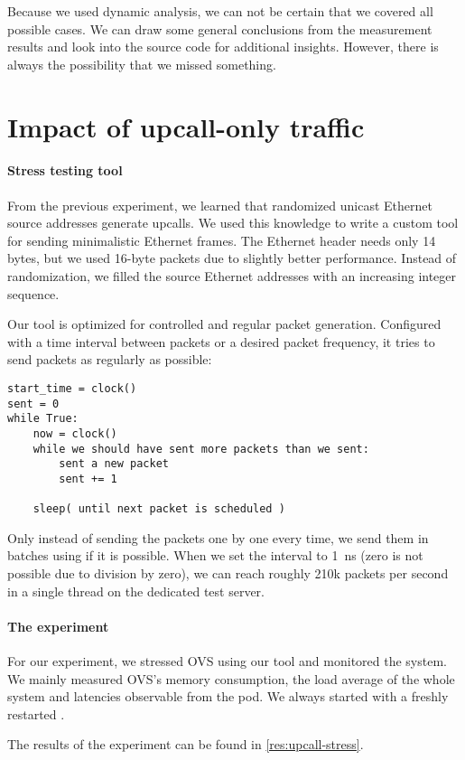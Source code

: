 Because we used dynamic analysis, we can not be certain that we covered all possible cases. We can draw some general conclusions from the measurement results and look into the source code for additional insights. However, there is always the possibility that we missed something.

\section{Impact of upcall-only traffic}
\label{design:upcall-impact}

\paragraph{Stress testing tool}
From the previous experiment, we learned that randomized unicast Ethernet source addresses generate upcalls. We used this knowledge to write a custom tool for sending minimalistic Ethernet frames. The Ethernet header needs only 14 bytes, but we used 16-byte packets due to slightly better performance. Instead of randomization, we filled the source Ethernet addresses with an increasing integer sequence.

Our tool is optimized for controlled and regular packet generation. Configured with a time interval between packets or a desired packet frequency, it tries to send packets as regularly as possible:

\begin{verbatim}
start_time = clock()
sent = 0
while True:
    now = clock()
    while we should have sent more packets than we sent:
        sent a new packet
        sent += 1
    
    sleep( until next packet is scheduled )
\end{verbatim}

Only instead of sending the packets one by one every time, we send them in batches using  if it is possible. When we set the interval to \qty{1}{\ns} (zero is not possible due to division by zero), we can reach roughly 210k packets per second in a single thread on the dedicated test server.

\paragraph{The experiment}
For our experiment, we stressed OVS using our tool and monitored the system. We mainly measured OVS's memory consumption, the load average of the whole system and latencies observable from the  pod. We always started with a freshly restarted .

The results of the experiment can be found in \cref{res:upcall-stress}.